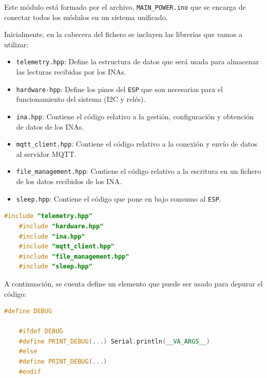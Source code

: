 Este módulo está formado por el archivo, \texttt{MAIN\_POWER.ino} que se encarga de conectar todos los módulos en un sistema unificado.

Inicialmente, en la cabecera del fichero se incluyen las librerías que vamos a utilizar:
\begin{itemize}
    \item \texttt{telemetry.hpp}: Define la estructura de datos que será usada para almacenar las lecturas recibidas por los INAs.
    \item \texttt{hardware-hpp}: Define los pines del \texttt{ESP} que son necesarias para el funcionamiento del sistema (I2C y relés).
    \item \texttt{ina.hpp}: Contiene el código relativo a la gestión, configuración y obtención de datos de los INAs. 
    \item \texttt{mqtt\_client.hpp}: Contiene el código relativo a la conexión y envío de datos al servidor MQTT.
    \item \texttt{file\_management.hpp}: Contiene el código relativo a la escritura en un fichero de los datos recibidos de los INA.
    \item \texttt{sleep.hpp}: Contiene el código que pone en bajo consumo al \texttt{ESP}.
\end{itemize}

\begin{lstlisting}[captionpos=b, caption={Cabecera con los módulos y ficheros utilizados}, language=c++]
    #include "telemetry.hpp"
    #include "hardware.hpp"
    #include "ina.hpp"
    #include "mqtt_client.hpp"
    #include "file_management.hpp"
    #include "sleep.hpp"
\end{lstlisting}

A continuación, se cuenta define un elemento que puede ser usado para depurar el código:
\begin{lstlisting}[captionpos=b, caption={Definición del debuger}, language=c++]
    #define DEBUG

    #ifdef DEBUG
    #define PRINT_DEBUG(...) Serial.println(__VA_ARGS__)
    #else
    #define PRINT_DEBUG(...)
    #endif    
\end{lstlisting}

